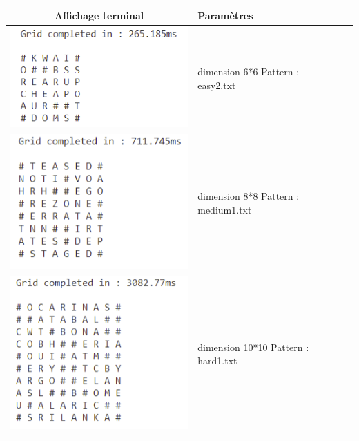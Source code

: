 \documentclass [ 11 pt ] {article}
\begin{document}
        \begin{center}
    \begin{tabular}{ | c |  m{5cm} | m{5cm} | }
    \hline
    Affichage terminal & Paramètres \\ 
    \hline
      \includegraphics[]{easy 6_6 black.png}
    & dimension 6*6 \newline Pattern : easy2.txt\\
    \hline
    \includegraphics[]{medium 8_8 black.png}
    & dimension 8*8 \newline Pattern : medium1.txt\\
    \hline
    \includegraphics[]{hard 10_10 black.png}
    & dimension 10*10 \newline Pattern : hard1.txt\\
    \hline
    \end{tabular}
    \end{center}
    
\end{document}
